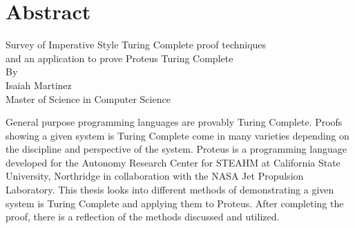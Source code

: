\chapter*{\normalfont Abstract}\label{chapter:Abstract}
\begin{center}
    Survey of Imperative Style Turing Complete proof techniques\\
    and an application to prove Proteus Turing Complete\\
    \vspace{0.15in}
    By\\
    \vspace{0.15in}
    Isaiah Martinez\\
    \vspace{0.3in}
    Master of Science in Computer Science\\
    \vspace{0.15in}
\end{center}

General purpose programming languages are provably Turing Complete.
Proofs showing a given system is Turing Complete come in many varieties depending on the discipline and perspective of the system.
Proteus is a programming language developed for the Autonomy Research Center for STEAHM at California State University, Northridge in collaboration with the NASA Jet Propulsion Laboratory.
This thesis looks into different methods of demonstrating a given system is Turing Complete and applying them to Proteus.
After completing the proof, there is a reflection of the methods discussed and utilized.